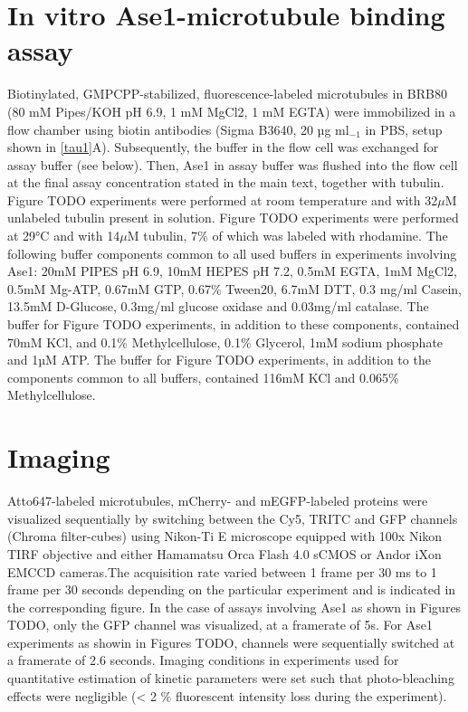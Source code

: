 \section{In vitro Ase1-microtubule binding assay}
Biotinylated, GMPCPP-stabilized, fluorescence-labeled microtubules in BRB80 (80 mM Pipes/KOH pH 6.9, 1 mM MgCl2, 1 mM EGTA) were immobilized in a flow chamber using biotin antibodies (Sigma B3640, 20 µg ml$_{−1}$ in PBS, setup shown in \autoref{tau1}A). Subsequently, the buffer in the flow cell was exchanged for assay buffer (see below). Then, Ase1 in assay buffer was flushed into the flow cell at the final assay concentration stated in the main text, together with tubulin. Figure TODO experiments were performed at room temperature and with 32$\mu$M unlabeled tubulin present in solution. Figure TODO experiments were performed at 29°C and with 14$\mu$M tubulin, 7\% of which was labeled with rhodamine. The following buffer components common to all used buffers in experiments involving Ase1: 20mM PIPES pH 6.9, 10mM HEPES pH 7.2, 0.5mM EGTA, 1mM MgCl2, 0.5mM Mg-ATP, 0.67mM GTP, 0.67\% Tween20, 6.7mM DTT, 0.3 mg/ml Casein, 13.5mM D-Glucose, 0.3mg/ml glucose oxidase and 0.03mg/ml catalase. The buffer for Figure TODO experiments, in addition to these components, contained 70mM KCl, and 0.1\% Methylcellulose, 0.1\% Glycerol, 1mM sodium phosphate and 1µM ATP. The buffer for Figure TODO experiments, in addition to the components common to all buffers, contained 116mM KCl and 0.065\% Methylcellulose.

\section{Imaging}
Atto647-labeled microtubules, mCherry- and mEGFP-labeled proteins were visualized sequentially by switching between the Cy5, TRITC and GFP channels (Chroma filter-cubes) using Nikon-Ti E microscope equipped with 100x Nikon TIRF objective and either Hamamatsu Orca Flash 4.0 sCMOS or Andor iXon EMCCD cameras.The acquisition rate varied between 1 frame per 30 ms to 1 frame per 30 seconds depending on the particular experiment and is indicated in the corresponding figure.  In the case of assays involving Ase1 as shown in Figures TODO, only the GFP channel was visualized, at a framerate of 5s. For Ase1 experiments as showin in Figures TODO, channels were sequentially switched at a framerate of 2.6 seconds. Imaging conditions in experiments used for quantitative estimation of kinetic parameters were set such that photo-bleaching effects were negligible (< 2 \% fluorescent intensity loss during the experiment). 
